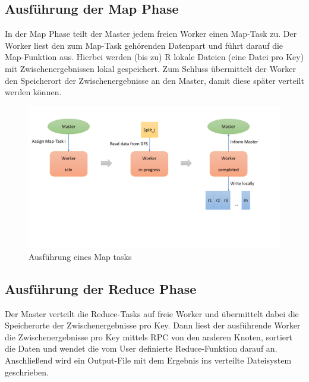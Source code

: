 \subsection*{Ausführung der Map Phase}

In der Map Phase teilt der Master jedem freien Worker einen Map-Task zu.
Der Worker liest den zum Map-Task gehörenden Datenpart und führt darauf die Map-Funktion aus.
Hierbei werden (bis zu) R lokale Dateien (eine Datei pro Key) mit
Zwischenergebnissen lokal gespeichert.
Zum Schluss übermittelt der Worker den Speicherort der Zwischenergebnisse an den Master, damit diese später verteilt werden können.

\begin{figure}[H]
\includegraphics[width=\textwidth]{pics/mapReduce/mapassign}
	\caption{Ausführung eines Map tasks}
\end{figure}

\subsection*{Ausführung der Reduce Phase}

Der Master verteilt die Reduce-Tasks auf freie Worker und übermittelt dabei die Speicherorte der Zwischenergebnisse pro Key.
Dann liest der ausführende Worker die Zwischenergebnisse pro Key mittels RPC von den anderen Knoten, sortiert die Daten und wendet die vom User definierte Reduce-Funktion darauf an.
Anschließend wird ein Output-File mit dem Ergebnis ins verteilte Dateisystem geschrieben.


